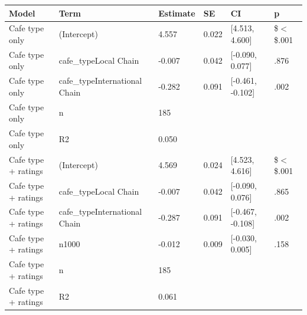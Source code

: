 \begin{table}[ht]
\centering
\begingroup\footnotesize
\begin{tabular}{llllll}
  \toprule
Model & Term & Estimate & SE & CI & p \\ 
  \midrule
Cafe type only & (Intercept) & 4.557 & 0.022 & [4.513, 4.600] & \$$<$\$.001 \\ 
  Cafe type only & cafe\_typeLocal Chain & -0.007 & 0.042 & [-0.090, 0.077] & .876 \\ 
  Cafe type only & cafe\_typeInternational Chain & -0.282 & 0.091 & [-0.461, -0.102] & .002 \\ 
  Cafe type only & n & 185 &  &  &  \\ 
  Cafe type only & R2 & 0.050 &  &  &  \\ 
  Cafe type + ratings & (Intercept) & 4.569 & 0.024 & [4.523, 4.616] & \$$<$\$.001 \\ 
  Cafe type + ratings & cafe\_typeLocal Chain & -0.007 & 0.042 & [-0.090, 0.076] & .865 \\ 
  Cafe type + ratings & cafe\_typeInternational Chain & -0.287 & 0.091 & [-0.467, -0.108] & .002 \\ 
  Cafe type + ratings & n1000 & -0.012 & 0.009 & [-0.030, 0.005] & .158 \\ 
  Cafe type + ratings & n & 185 &  &  &  \\ 
  Cafe type + ratings & R2 & 0.061 &  &  &  \\ 
   \bottomrule
\end{tabular}
\endgroup
\end{table}
